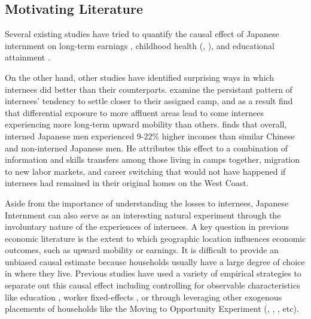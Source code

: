 \subsection{Motivating Literature}\label{motivation}

Several existing studies have tried to quantify the causal effect of Japanese internment on 
long-term earnings
\citep{chinLongRunLaborMarket2005}, 
childhood health
(\cite{saavedraEarlyChildhoodConditions2013}, \cite{grossmanIntergenerationalHealthEffects2025}),
and educational attainment 
\citep{saavedraSchoolQualityEducational2015}. 

On the other hand, other studies have identified surprising ways in which internees did better than their counterparts.
\cite{shoagCausalEffectPlace2016} examine the persistant pattern of internees' tendency to settle closer to their assigned camp,
and as a result find that differential exposure to more affluent areas lead to some internees experiencing more long-term upward mobility than others.
\cite{arellano-boverDisplacementDiversityMobility2022} finds that overall, interned Japanese men experienced 9-22\% higher incomes than similar Chinese and non-interned Japanese men.
He attributes this effect to a combination of information and skills transfers among those living in camps together,
migration to new labor markets, and career switching that would not have happened if internees had remained in their original homes on the West Coast.

Aside from the importance of understanding the losses to internees, Japanese
Internment can also serve as an interesting natural experiment through the
involuntary nature of the experiences of internees. 
A key question in previous economic literature is the extent to which 
geographic location influences economic outcomes, such as upward mobility or earnings.
It is difficult to provide an unbiased causal estimate because households usually
have a large degree of choice in where they live. Previous studies have used a
variety of empirical strategies to separate out this causal effect including
controlling for observable characteristics like education
\cite{glaeserCitiesSkills2001}, worker fixed-effects \citep{cardLocationLocationLocation2021}, or
through leveraging other exogenous placements of households like the Moving to
Opportunity Experiment (\cite{ludwigLongTermNeighborhoodEffects2013},
\cite{chettyEffectsExposureBetter2016}, \cite{bergmanCreatingMovesOpportunity2019}, etc). 